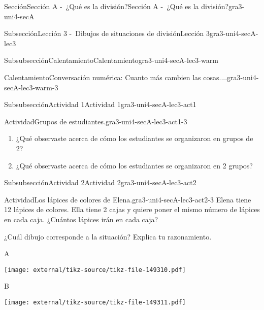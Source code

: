 \documentclass[twoside,14pt,]{extarticle}
\begin{document}
\begin{sectionptx}{Sección}{Sección A -~¿Qué es la división?}{}{Sección A -~¿Qué es la división?}{}{}{gra3-uni4-secA}
\begin{subsectionptx}{Subsección}{Lección 3 -~Dibujos de situaciones de división}{}{Lección 3}{}{}{gra3-uni4-secA-lec3}
\begin{subsubsectionptx}{Subsubsección}{Calentamiento}{}{Calentamiento}{}{}{gra3-uni4-secA-lec3-warm}
\begin{exploration}{Calentamiento}{Conversación numérica: Cuanto más cambien las cosas....}{gra3-uni4-secA-lec3-warm-3}
\begin{itemize}[label=\textbullet]
\end{itemize}
%
\end{exploration}%
\end{subsubsectionptx}
%
%
\typeout{************************************************}
\typeout{************************************************}
%
\begin{subsubsectionptx}{Subsubsección}{Actividad 1}{}{Actividad 1}{}{}{gra3-uni4-secA-lec3-act1}
\begin{activity}{Actividad}{Grupos de estudiantes.}{gra3-uni4-secA-lec3-act1-3}%
%
\begin{enumerate}
\item{}¿Qué observaste acerca de cómo los estudiantes se organizaron en grupos de 2?%
\item{}¿Qué observaste acerca de cómo los estudiantes se organizaron en 2 grupos?%
\end{enumerate}
%
\end{activity}%
\end{subsubsectionptx}
%
%
\typeout{************************************************}
\typeout{************************************************}
%
\begin{subsubsectionptx}{Subsubsección}{Actividad 2}{}{Actividad 2}{}{}{gra3-uni4-secA-lec3-act2}
\begin{activity}{Actividad}{Los lápices de colores de Elena.}{gra3-uni4-secA-lec3-act2-3}%
Elena tiene 12 lápices de colores. Ella tiene 2 cajas y quiere poner el mismo número de lápices en cada caja. ¿Cuántos lápices irán en cada caja?%
\par
¿Cuál dibujo corresponde a la situación? Explica tu razonamiento.%
\begin{sidebyside}{2}{0}{0}{0}%
\begin{sbspanel}{0.5}%
A%
\par
\texttt{[image: external/tikz-source/tikz-file-149310.pdf]}
\end{sbspanel}%
\begin{sbspanel}{0.5}%
B%
\par
\texttt{[image: external/tikz-source/tikz-file-149311.pdf]}
\end{sbspanel}%
\end{sidebyside}%
\end{activity}%
\end{subsubsectionptx}
%
%
\typeout{************************************************}

\end{subsectionptx}
\end{sectionptx}
\end{document}
